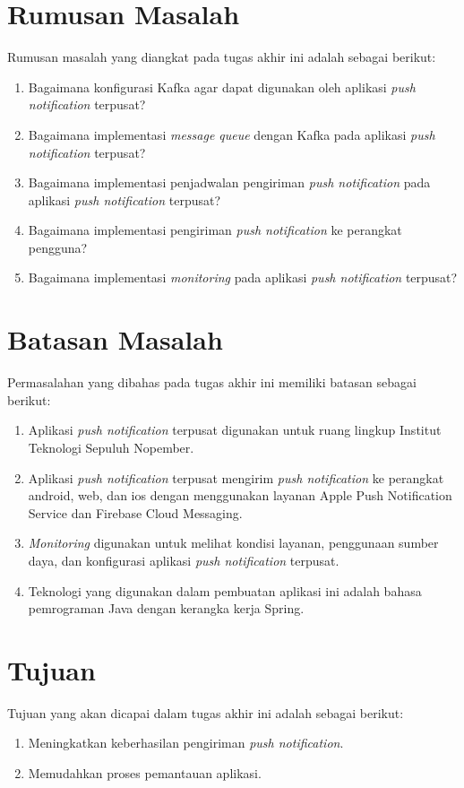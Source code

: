 \section {Rumusan Masalah}
Rumusan masalah yang diangkat pada tugas akhir ini adalah sebagai berikut:
\begin {enumerate}
\item Bagaimana konfigurasi Kafka agar dapat digunakan oleh aplikasi \textit{push notification} terpusat?
\item Bagaimana implementasi \textit{message queue} dengan Kafka pada aplikasi \textit{push notification} terpusat?
\item Bagaimana implementasi penjadwalan pengiriman \textit{push notification} pada aplikasi \textit{push notification} terpusat?
\item Bagaimana implementasi pengiriman \textit{push notification} ke perangkat pengguna?
\item Bagaimana implementasi \textit{monitoring} pada aplikasi \textit{push notification} terpusat?
\end {enumerate}

\section {Batasan Masalah}
Permasalahan yang dibahas pada tugas akhir ini memiliki batasan sebagai berikut:
\begin {enumerate}
\item Aplikasi \textit{push notification} terpusat digunakan untuk ruang lingkup Institut Teknologi Sepuluh Nopember.
\item Aplikasi \textit{push notification} terpusat mengirim \textit{push notification} ke perangkat android, web, dan ios dengan menggunakan layanan Apple Push Notification Service dan Firebase Cloud Messaging.
\item \textit{Monitoring} digunakan untuk melihat kondisi layanan, penggunaan sumber daya, dan konfigurasi aplikasi \textit{push notification} terpusat.
\item Teknologi yang digunakan dalam pembuatan aplikasi ini adalah bahasa pemrograman Java dengan kerangka kerja Spring.
\end {enumerate}

\section {Tujuan}
Tujuan yang akan dicapai dalam tugas akhir ini adalah sebagai berikut:
\begin{enumerate}
	\item Meningkatkan keberhasilan pengiriman \textit{push notification}.
	\item Memudahkan proses pemantauan aplikasi.
\end{enumerate}

